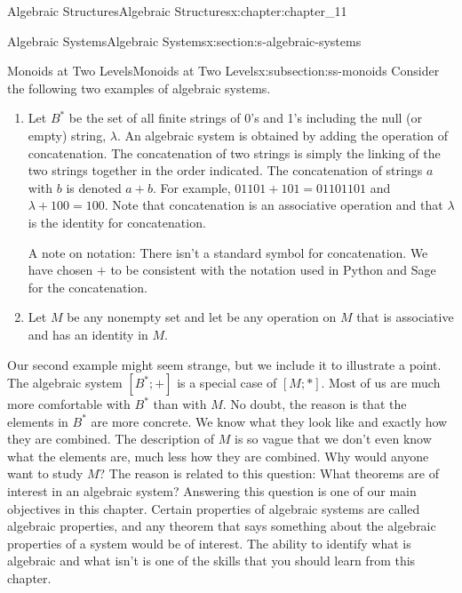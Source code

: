 \documentclass[twoside,10pt,]{book}
\numberwithin{equation}{section}
\begin{document}
\begin{chapterptx}{Algebraic Structures}{}{Algebraic Structures}{}{}{x:chapter:chapter_11}
\begin{sectionptx}{Algebraic Systems}{}{Algebraic Systems}{}{}{x:section:s-algebraic-systems}
\begin{introduction}{}
\end{introduction}%
%
%
\typeout{************************************************}
\typeout{************************************************}
%
\begin{subsectionptx}{Monoids at Two Levels}{}{Monoids at Two Levels}{}{}{x:subsection:ss-monoids}
Consider the following two examples of algebraic systems.%
\par
%
\begin{enumerate}[label=(\alph*)]
\item{}\label{g:notation:idm404595151664}  Let \(B^*\) be the set of all finite strings of 0's and 1's including the null (or empty) string, \(\lambda\). An algebraic system is obtained by adding the operation of concatenation. The concatenation of two strings is simply the linking of the two strings together in the order indicated. The concatenation of strings \(a\) with \(b\) is denoted \(a+b\).  For example, \(01101+101 =01101101\) and \(\lambda +100 = 100\). Note that concatenation is an associative operation and that \(\lambda\)  is the identity for concatenation.%
\par
A note on notation:  There isn't a standard symbol for concatenation.  We have chosen \(+\) to be consistent with the notation used in Python and Sage for the concatenation.%
\item{}Let \(M\) be any nonempty set and let \textasteriskcentered{} be any operation on \(M\) that is associative and has an identity in \(M\).%
\end{enumerate}
%
\par
Our second example might seem strange, but we include it to illustrate a point. The algebraic system \(\left[B^*;+\right]\) is a special case of \([M;*]\).  Most of us are much more comfortable with \(B^*\) than with \(M\).  No doubt, the reason is that the elements in \(B^*\) are more concrete.  We know what they look like and exactly how they are combined. The description of \(M\) is so vague that we don't even know what the elements are, much less how they are combined. Why would anyone want to study \(M\)? The reason is related to this question: What theorems are of interest in an algebraic system? Answering this question is one of our main objectives in this chapter.  Certain properties of algebraic systems are called algebraic properties, and any theorem that says something about the algebraic properties of a system would be of interest. The ability to identify what is algebraic and what isn't is one of the skills that you should learn from this chapter.%

\end{subsectionptx}
\end{sectionptx}
\end{chapterptx}
\end{document}

